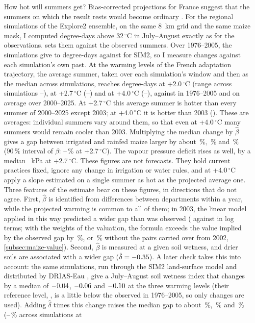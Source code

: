 How hot will summers get? Bias-corrected projections for France suggest that the summers on which the result rests would become ordinary \parencite{drias2022}. For the \DriasModels{} regional simulations of the Explore2 ensemble, on the same 8~km grid and the same maize mask, I computed degree-days above 32\,$^{\circ}$C in July--August exactly as for the observations.  sets them against the observed summers. Over 1976--2005, the simulations give \DriasCtlMin{} to \DriasCtlMax{} degree-days against \DriasCtlSim{} for SIM2, so I measure changes against each simulation's own past. At the warming levels of the French adaptation trajectory, the average summer, taken over each simulation's window and then as the median across simulations, reaches \DriasDdTwo{} degree-days at +2.0\,$^{\circ}$C (range across simulations \DriasDdTwoMin--\DriasDdTwoMax), \DriasDdTwoSeven{} at +2.7\,$^{\circ}$C (\DriasDdTwoSevenMin--\DriasDdTwoSevenMax) and \DriasDdFour{} at +4.0\,$^{\circ}$C (\DriasDdFourMin--\DriasDdFourMax), against \DriasDdRef{} in 1976--2005 and \DriasObsMean{} on average over 2000--2025. At +2.7\,$^{\circ}$C this average summer is hotter than every summer of 2000--2025 except 2003; at +4.0\,$^{\circ}$C it is hotter than 2003 (\DriasObsThree). These are averages: individual summers vary around them, so that even at +4.0\,$^{\circ}$C many summers would remain cooler than 2003. Multiplying the median change by $\hat\beta$ gives a gap between irrigated and rainfed maize larger by about \DriasGapTwo\,\%, \DriasGapTwoSeven\,\% and \DriasGapFour\,\% (90\,\% interval of $\beta$: \DriasGapTwoSevenLow--\DriasGapTwoSevenHigh\,\% at +2.7\,$^{\circ}$C). The vapour pressure deficit rises as well, by a median \DriasVpdTwoSeven~kPa at +2.7\,$^{\circ}$C. These figures are not forecasts. They hold current practices fixed, ignore any change in irrigation or water rules, and at +4.0\,$^{\circ}$C apply a slope estimated on a single summer as hot as the projected average one. Three features of the estimate bear on these figures, in directions that do not agree. First, $\hat\beta$ is identified from differences between departments within a year, while the projected warming is common to all of them; in 2003, the linear model applied in this way predicted a wider gap than was observed (\LinPredThree{} against \ObsThree{} in log terms; with the weights of the valuation, the formula exceeds the value implied by the observed gap by \ValOverPct\,\%, or \ValOverNoRepPct\,\% without the pairs carried over from 2002, \cref{subsec:maize-value}). Second, $\hat\beta$ is measured at a given soil wetness, and drier soils are associated with a wider gap ($\hat\delta = -0.35$). A later check takes this into account: the same simulations, run through the SIM2 land-surface model and distributed by DRIAS-Eau \parencite{driaseau2024}, give a July--August soil wetness index that changes by a median of $-0.04$, $-0.06$ and $-0.10$ at the three warming levels (their reference level, \SoilRefSwi, is a little below the \SoilObsSwi{} observed in 1976--2005, so only changes are used). Adding $\hat\delta$ times this change raises the median gap to about \SoilGapTwo\,\%, \SoilGapTwoSeven\,\% and \SoilGapFour\,\% (\SoilGapFourMin--\SoilGapFourMax\,\% across simulations at 